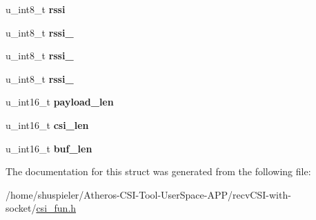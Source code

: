 \begin{DoxyCompactItemize}
\item 
\hypertarget{structcsi__struct_a81517650e0bd4b40b69cbb7519862ad9}{u\+\_\+int8\+\_\+t {\bfseries rssi}}\label{structcsi__struct_a81517650e0bd4b40b69cbb7519862ad9}

\item 
\hypertarget{structcsi__struct_abe7e5ea18326e92122ecf1e6cce77355}{u\+\_\+int8\+\_\+t {\bfseries rssi\+\_}}\label{structcsi__struct_abe7e5ea18326e92122ecf1e6cce77355}

\item 
\hypertarget{structcsi__struct_afca064b2c4623ad1d55d56063bb4c78a}{u\+\_\+int8\+\_\+t {\bfseries rssi\+\_}}\label{structcsi__struct_afca064b2c4623ad1d55d56063bb4c78a}

\item 
\hypertarget{structcsi__struct_a063f3e3d0def7a2dab87c850fdcca617}{u\+\_\+int8\+\_\+t {\bfseries rssi\+\_}}\label{structcsi__struct_a063f3e3d0def7a2dab87c850fdcca617}

\item 
\hypertarget{structcsi__struct_a720918e326e84706700c4fa610ec2450}{u\+\_\+int16\+\_\+t {\bfseries payload\+\_\+len}}\label{structcsi__struct_a720918e326e84706700c4fa610ec2450}

\item 
\hypertarget{structcsi__struct_ae81d4b882c49c003ed821d6ccbb970b6}{u\+\_\+int16\+\_\+t {\bfseries csi\+\_\+len}}\label{structcsi__struct_ae81d4b882c49c003ed821d6ccbb970b6}

\item 
\hypertarget{structcsi__struct_a4d1117d5f7f471c95f78273a5ecc8d50}{u\+\_\+int16\+\_\+t {\bfseries buf\+\_\+len}}\label{structcsi__struct_a4d1117d5f7f471c95f78273a5ecc8d50}

\end{DoxyCompactItemize}


The documentation for this struct was generated from the following file\+:\begin{DoxyCompactItemize}
\item 
/home/shuspieler/\+Atheros-\/\+C\+S\+I-\/\+Tool-\/\+User\+Space-\/\+A\+P\+P/recv\+C\+S\+I-\/with-\/socket/\hyperlink{csi__fun_8h}{csi\+\_\+fun.\+h}\end{DoxyCompactItemize}
